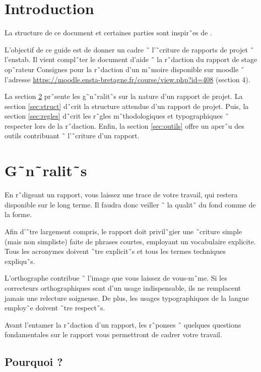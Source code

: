 \section{Introduction}

La structure de ce document et certaines parties sont inspir˜es de
\cite{guide}.

L'objectif de ce guide est de donner un cadre ˜ l'˜criture de rapports 
de projet
˜ l'\gls{enstab}.
Il vient compl˜ter le document d'aide ˜ la
r˜daction du rapport de stage op˜rateur \og{}Consignes pour la r˜daction d'un
m˜moire\fg{} disponible sur moodle ˜ l'adresse 
\url{https://moodle.ensta-bretagne.fr/course/view.php?id=408} (section 4). 


La section \ref{sec:gen} pr˜sente les g˜n˜ralit˜s sur la nature d'un rapport
de projet. La section \ref{sec:struct} d˜crit la structure attendue d'un rapport de
projet.
Puis, la section \ref{sec:regles} d˜crit les r˜gles m˜thodologiques et
typographiques ˜ respecter lors de la r˜daction.
Enfin, la section
\ref{sec:outils} offre un aper˜u des outils contribuant ˜ l'˜criture d'un rapport.


\section{G˜n˜ralit˜s}
\label{sec:gen}

En r˜digeant un rapport, vous laissez une trace de votre travail, qui restera
disponible sur le long terme. Il faudra donc veiller ˜ la qualit˜ du fond
comme de la forme.

Afin d'˜tre largement compris, le rapport doit privil˜gier une
˜criture simple (mais non simpliste) faite de phrases courtes,
employant un vocabulaire explicite. Tous les acronymes doivent ˜tre explicit˜s
et tous les termes techniques expliqu˜s.

L'orthographe contribue ˜ l'image que vous laissez de vous-m˜me. Si les
correcteurs orthographiques sont d'un usage indispensable, ils ne remplacent
jamais une relecture soigneuse.
De plus, les usages typographiques de la langue employ˜e doivent ˜tre respect˜s.

Avant l'entamer la r˜daction d'un rapport, les r˜ponses ˜ quelques questions
fondamentales sur le rapport vous permettront de cadrer votre travail.

\subsection*{Pourquoi ?}

